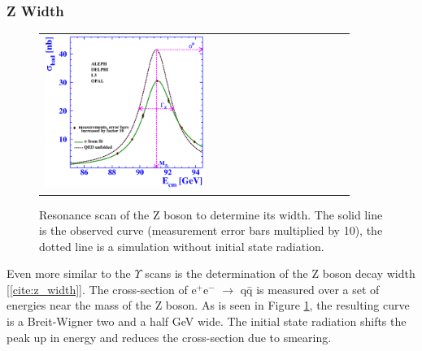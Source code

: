 \documentclass[12pt]{article}
\begin{document}
\subsubsection{Z Width}

\begin{figure}
  \begin{center}
    \begin{tabular}{p{0.55\linewidth} c p{0.35\linewidth}}
      \begin{minipage}{\linewidth}
        \includegraphics[width=\linewidth]{z_width.eps}
      \end{minipage} & &
      \begin{minipage}{\linewidth}

  	\caption{Resonance scan of the Z boson to determine its width.
  	The solid line is the observed curve (measurement error bars
  	multiplied by 10), the dotted line is a simulation without
  	initial state radiation.}

      \end{minipage} \\
    \end{tabular}
  \end{center}

  \label{fig:z_width}
\end{figure}

Even more similar to the $\Upsilon$ scans is the determination of the
Z boson decay width [\ref{cite:z_width}]. The cross-section of
e$^+$e$^-$ $\to$ q\={q} is measured over a set of energies
near the mass of the Z boson. As is seen in Figure \ref{fig:z_width},
the resulting curve is a Breit-Wigner two and a half GeV wide. The
initial state radiation shifts the peak up in energy and reduces the
cross-section due to smearing.
\end{document}
